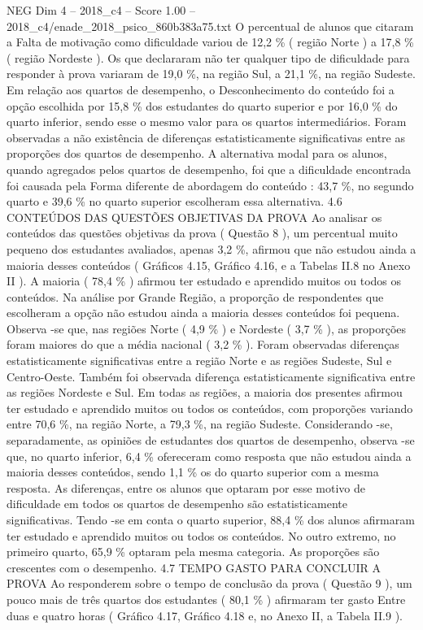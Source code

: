 \begin{textsample}{NEG Dim 4 – 2018\_c4 – Score 1.00 – 2018\_c4/enade\_2018\_psico\_860b383a75.txt}
O percentual de alunos que citaram a Falta de motivação como dificuldade variou de 12,2 \% ( região Norte ) a 17,8 \% ( região Nordeste ).
Os que declararam não ter qualquer tipo de dificuldade para responder à prova variaram de 19,0 \%, na região Sul, a 21,1 \%, na região Sudeste.
Em relação aos quartos de desempenho, o Desconhecimento do conteúdo foi a opção escolhida por 15,8 \% dos estudantes do quarto superior e por 16,0 \% do quarto inferior, sendo esse o mesmo valor para os quartos intermediários.
Foram observadas a não existência de diferenças estatisticamente significativas entre as proporções dos quartos de desempenho.
A alternativa modal para os alunos, quando agregados pelos quartos de desempenho, foi que a dificuldade encontrada foi causada pela Forma diferente de abordagem do conteúdo : 43,7 \%, no segundo quarto e 39,6 \% no quarto superior escolheram essa alternativa. 4.6 CONTEÚDOS DAS QUESTÕES OBJETIVAS DA PROVA Ao analisar os conteúdos das questões objetivas da prova ( Questão 8 ), um percentual muito pequeno dos estudantes avaliados, apenas 3,2 \%, afirmou que não estudou ainda a maioria desses conteúdos ( Gráficos 4.15, Gráfico 4.16, e a Tabelas II.8 no Anexo II ).
A maioria ( 78,4 \% ) afirmou ter estudado e aprendido muitos ou todos os conteúdos.
Na análise por Grande Região, a proporção de respondentes que escolheram a opção não estudou ainda a maioria desses conteúdos foi pequena.
Observa -se que, nas regiões Norte ( 4,9 \% ) e Nordeste ( 3,7 \% ), as proporções foram maiores do que a média nacional ( 3,2 \% ).
Foram observadas diferenças estatisticamente significativas entre a região Norte e as regiões Sudeste, Sul e Centro-Oeste.
Também foi observada diferença estatisticamente significativa entre as regiões Nordeste e Sul.
Em todas as regiões, a maioria dos presentes afirmou ter estudado e aprendido muitos ou todos os conteúdos, com proporções variando entre 70,6 \%, na região Norte, a 79,3 \%, na região Sudeste.
Considerando -se, separadamente, as opiniões de estudantes dos quartos de desempenho, observa -se que, no quarto inferior, 6,4 \% ofereceram como resposta que não estudou ainda a maioria desses conteúdos, sendo 1,1 \% os do quarto superior com a mesma resposta.
As diferenças, entre os alunos que optaram por esse motivo de dificuldade em todos os quartos de desempenho são estatisticamente significativas.
Tendo -se em conta o quarto superior, 88,4 \% dos alunos afirmaram ter estudado e aprendido muitos ou todos os conteúdos.
No outro extremo, no primeiro quarto, 65,9 \% optaram pela mesma categoria.
As proporções são crescentes com o desempenho. 4.7 TEMPO GASTO PARA CONCLUIR A PROVA Ao responderem sobre o tempo de conclusão da prova ( Questão 9 ), um pouco mais de três quartos dos estudantes ( 80,1 \% ) afirmaram ter gasto Entre duas e quatro horas ( Gráfico 4.17, Gráfico 4.18 e, no Anexo II, a Tabela II.9 ).

\end{textsample}
